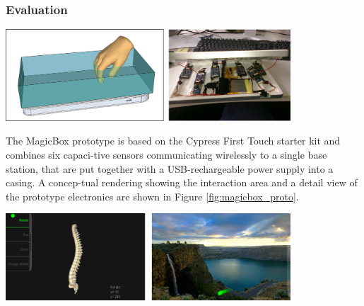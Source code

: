 \subsubsection{Evaluation}
\begin{minipage}{\linewidth}
\centering
\includegraphics[width=0.8\textwidth]{images/magicbox_proto}
\label{fig:magicbox_proto}
\end{minipage}

The MagicBox prototype is based on the Cypress First Touch starter kit \cite{cypressfirst} and combines six capaci-tive sensors communicating wirelessly to a single base station, that are put together with a USB-rechargeable power supply into a casing. A concep-tual rendering showing the interaction area and a detail view of the prototype electronics are shown in Figure \ref{fig:magicbox_proto}.

\begin{minipage}{\linewidth}
\centering
\includegraphics[width=0.8\textwidth]{images/magicbox_eval}
\label{fig:magicbox_eval}
\end{minipage}

